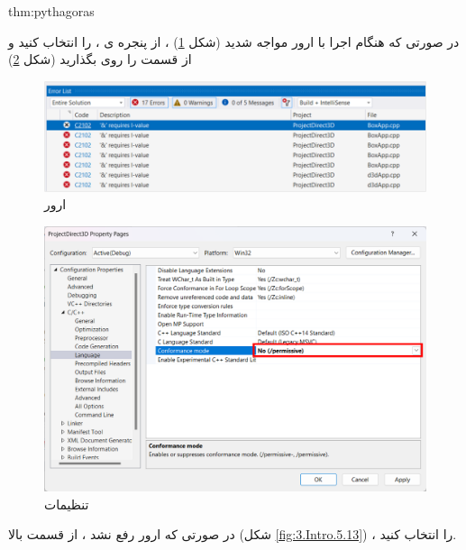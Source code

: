 \begin{point}{thm:pythagoras}
{
    \Large
    \begin{spacing}{1.5}
        در صورتی که هنگام اجرا با ارور  مواجه شدید (شکل \ref{fig:3.Intro.5.11}) ،
        از پنجره ی  ،   را انتخاب کنید و از قسمت  را روی  بگذارید (شکل \ref{fig:3.Intro.5.12})

        \begin{figure}[H]
            \centering
            \setlength{\belowcaptionskip}{-10pt}
            \includegraphics[width=\textwidth]{Images/3/3.Intro.5.11}
            \caption{ارور }
            \label{fig:3.Intro.5.11}
        \end{figure}

        \begin{figure}[H]
            \centering
            \setlength{\belowcaptionskip}{-10pt}
            \includegraphics[width=\textwidth]{Images/3/3.Intro.5.12}
            \caption{تنظیمات }
            \label{fig:3.Intro.5.12}
        \end{figure}

        در صورتی که ارور رفع نشد ، از قسمت بالا (شکل \ref{fig:3.Intro.5.13}) ،  را انتخاب کنید.


\end{spacing}}
\end{point}
